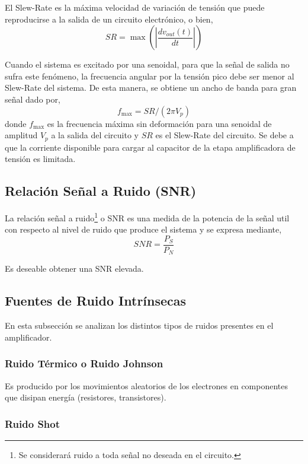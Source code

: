 \documentclass[a4paper,12pt,twoside]{article}
\begin{document}
El Slew-Rate es la máxima velocidad de variación de tensión que puede reproducirse a la salida de un circuito electrónico, o bien,
\begin{equation} SR = \max \left(\left|\frac{dv_{out}(t)}{dt}\right|\right) \end{equation}

Cuando el sistema es excitado por una senoidal, para que la señal de salida no sufra este fenómeno, la frecuencia angular por la tensión pico debe ser menor al Slew-Rate del sistema. De esta manera, se obtiene un ancho de banda para gran señal dado por,
\begin{equation} f_{\max}= SR/(2 \pi V_p) \end{equation}
donde $f_{\max}$ es la frecuencia máxima sin deformación para una senoidal de amplitud $V_p$ a la salida del circuito y $SR$ es el Slew-Rate del circuito. Se debe a que la corriente disponible para cargar al capacitor de la etapa amplificadora de tensión es limitada.

\subsection{Relación Señal a Ruido (SNR)}

La relación señal a ruido\footnote{Se considerará ruido a toda señal no deseada en el circuito.} o SNR es una medida de la potencia de la señal util con respecto al nivel de ruido que produce el sistema y se expresa mediante,
\begin{equation} SNR=\frac{P_{S}}{P_{N}} \end{equation}

Es deseable obtener una SNR elevada.

\subsection{Fuentes de Ruido Intrínsecas}

En esta subsección se analizan los distintos tipos de ruidos presentes en el amplificador.

\subsubsection{Ruido Térmico o Ruido Johnson}

Es producido por los movimientos aleatorios de los electrones en componentes que disipan energía (resistores, transistores).

\subsubsection{Ruido Shot}
\end{document}
